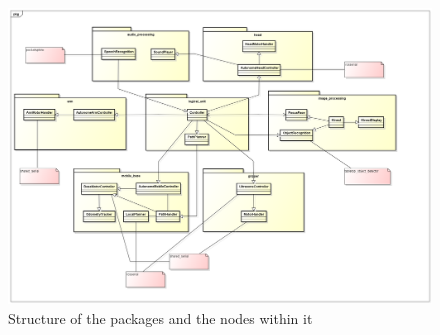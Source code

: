 \documentclass[technical_document.tex]{subfiles}
\begin{document}
\begin{figure}[ht!]
	\centering
	\mbox{\includegraphics[scale=0.3]{Images/nodes.png}}
	\caption{Structure of the packages and the nodes within it}
	\label{fig:nodes}
\end{figure}
\end{document}
